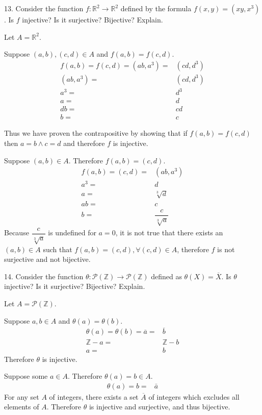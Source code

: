 \documentclass{hippoidC}
\begin{document}
\begin{prooflist}{13. Consider the function $f: \mathbb{R}^2 \rightarrow
    \mathbb{R}^2$ defined by the formula $f(x, y)=\left(x y, x^3\right)$. Is $f$
injective? Is it surjective? Bijective? Explain.}
\inj{}
\item Let $A=\mathbb{R}^2$.
\item Suppose $(a, b), (c, d) \in A$ and $f(a, b)=f(c, d)$.
\begin{align*}
    f(a, b)=f(c, d)=(ab, a^3) =& (cd, d^3)\\
    (ab, a^3) =& (cd, d^3)\\
    a^3=& d^3\\
    a=& d\\
    db=& cd\\
    b=& c
\end{align*}
\item Thus we have proven the contrapositive by showing that if $f(a, b)=f(c,
    d)$ then $a=b \land c=d$ and therefore $f$ is injective.
\surj{}
\item Suppose $(a, b)\in A$. Therefore $f(a, b)=(c, d)$.
\begin{align*}
    f(a, b)=(c,d)=&(ab, a^3)\\
    a^3=&d\\
    a=&\sqrt[3]{d}\\
    ab=&c\\
    b=&\dfrac{c}{\sqrt[3]{a}}
\end{align*}
Because $\dfrac{c}{\sqrt[3]{a}}$ is undefined for $a=0$, it is not true that
there exists an $(a, b)\in A$ such that $f(a, b)=(c, d), \forall (c, d) \in A$,
therefore $f$ is not surjective and not bijective.
\end{prooflist}

\begin{prooflist}{14. Consider the function $\theta: \mathscr{P}(\mathbb{Z})
    \rightarrow \mathscr{P}(\mathbb{Z})$ defined as $\theta(X)=\overline{X}$. Is
$\theta$ injective? Is it surjective? Bijective? Explain.}
\item Let $A=\mathscr{P}(\mathbb{Z})$.
\inj{}
\item Suppose $a, b \in A$ and $\theta(a)=\theta(b)$.
\begin{align*}
    \theta(a)=\theta(b)=\overline{a} =& \overline{b}\\
    \mathbb{Z} - a =& \mathbb{Z} -b \\
    a =& b
\end{align*}
Therefore $\theta$ is injective.
\surj{}
\item Suppose some $a\in A$. Therefore $\theta(a)=b\in A$.
\begin{align*}
    \theta(a)=b=&\bar{a}
\end{align*}
For any set $A$ of integers, there exists a set $\overline{A}$ of integers which excludes all
elements of $A$. Therefore $\theta$ is injective and surjective, and thus
bijective.
\end{prooflist}
\end{document}
